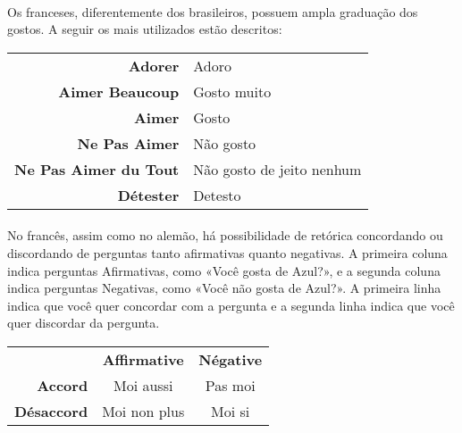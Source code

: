 \documentclass{article}
\begin{document}
        \paragraph{}Os franceses, diferentemente dos brasileiros, possuem ampla graduação dos gostos. A seguir os mais utilizados estão descritos:
        
            \begin{center}
                \begin{tabular}{r l}
                    \textbf{Adorer}               & Adoro\\
                    \textbf{Aimer Beaucoup}       & Gosto muito\\
                    \textbf{Aimer}                & Gosto\\
                    \textbf{Ne Pas Aimer}         & Não gosto\\
                    \textbf{Ne Pas Aimer du Tout} & Não gosto de jeito nenhum\\
                    \textbf{Détester}             & Detesto\\
                \end{tabular}
            \end{center}

        \paragraph{}No francês, assim como no alemão, há possibilidade de retórica concordando ou discordando de perguntas tanto afirmativas quanto negativas. A primeira coluna indica perguntas Afirmativas, como «Você gosta de Azul?», e a segunda coluna indica perguntas Negativas, como «Você não gosta de Azul?». A primeira linha indica que você quer concordar com a pergunta e a segunda linha indica que você quer discordar da pergunta.

            \begin{center}
                \begin{tabular}{r c c}
                                       & \textbf{Affirmative} & \textbf{Négative}\\[0.5ex]
                    \textbf{Accord}    & Moi aussi            & Pas moi\\
                    \textbf{Désaccord} & Moi non plus         & Moi si
                \end{tabular}
            \end{center}
                
\end{document}
